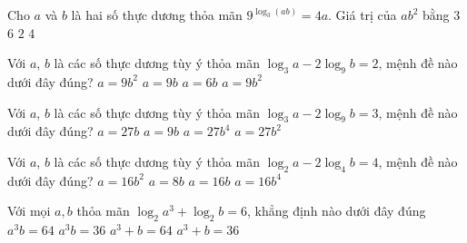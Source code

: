 \begin{ex}%
	[Mã 103 - 2020 Lần 1]
	Cho $a$ và $b$ là hai số thực dương thỏa mãn $9^{\log_3(ab)}=4a$. Giá trị của $a{b^2}$ bằng
	\choice
	{\True $3$}
	{$6$}
	{$2$}
	{$4$}
\end{ex}
\begin{ex}%
	[Mã 102 - 2020 Lần 2]
	Với $a$, $b$ là các số thực dương tùy ý thỏa mãn $\log_3a-2\log_9b=2$, mệnh đề nào dưới đây đúng?
	\choice
	{$a=9b^2$}
	{\True $a=9b$}
	{$a=6b$}
	{$a=9b^2$}
\end{ex}
\begin{ex}%
	[Mã 103 - 2020 Lần 2]
	Với $a$, $b$ là các số thực dương tùy ý thỏa mãn $\log_3a-2\log_9b=3$, mệnh đề nào dưới đây đúng?
	\choice
	{\True $a=27b$}
	{$a=9b$}
	{$a=27b^4$}
	{$a=27b^2$}
\end{ex}
\begin{ex}%
	[Mã 104 - 2020 Lần 2]
	Với $a$, $b$ là các số thực dương tùy ý thỏa mãn $\log_2a-2\log_4b=4$, mệnh đề nào dưới đây đúng?
	\choice
	{$a=16b^2$}
	{$a=8b$}
	{\True $a=16b$}
	{$a=16b^4$}
\end{ex}
\begin{ex}%
	[Mã 101 - 2021 Lần 1]
	Với mọi $ a,b$ thỏa mãn $\log_2a^3+\log_2b=6$, khẳng định nào dưới đây đúng
	\choice
	{\True $a^3b=64$}
	{$a^3b=36$}
	{$a^3+b=64$}
	{$a^3+b=36$}
\end{ex}
